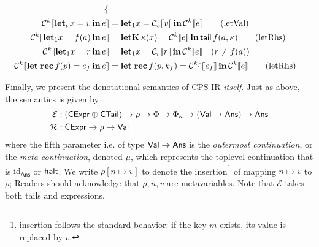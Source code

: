 \documentclass[a4paper, 11pt]{article}
\theoremstyle{remark}\newtheorem*{remark}{Remark}
\theoremstyle{definition}\newtheorem*{definition}{Definition}
\begin{document}
\begin{align*}
\begin{cases}
\end{cases}\\
\mathcal{C}^k\llbracket \mathbf{let}_\iota\, x = v\, \mathbf{in}\, e \rrbracket &=
\mathbf{let}_1 x = \mathcal{C}_v\llbracket v \rrbracket\, \mathbf{in}\, \mathcal{C}^k\llbracket e \rrbracket \tag{letVal} \\
\mathcal{C}^k\llbracket \mathbf{let}_1 x = f(a)\, \mathbf{in}\, e \rrbracket &=
\mathbf{letK}\, \kappa(x) = \mathcal{C}^k\llbracket e \rrbracket\, \mathbf{in}\, \mathsf{tail}\, f(a, \kappa) \tag{letRhs} \\
\mathcal{C}^k\llbracket \mathbf{let}_1 x = r\, \mathbf{in}\, e \rrbracket &=
\mathbf{let}_1 x = \mathcal{C}_r\llbracket r \rrbracket\, \mathbf{in}\, \mathcal{C}^k\llbracket e \rrbracket
\quad (r \neq f(a)) \\
\mathcal{C}^k\llbracket \mathbf{let\;rec}\, f(p) = e_f\, \mathbf{in}\, e \rrbracket &=
\mathbf{let\;rec}\, f(p, k_f) = \mathcal{C}^{k_f}\llbracket e_f \rrbracket\, \mathbf{in}\, \mathcal{C}^k\llbracket e \rrbracket \tag{letRhs} \\
\end{align*}
\endgroup

Finally, we present the denotational semantics of CPS IR \emph{itself}. Just as above, the semantics is
given by
\begin{align*}
\mathcal{E} &: (\mathsf{CExpr}\oplus\mathsf{CTail}) \to \rho \to \Phi \to \Phi_\kappa \to (\mathsf{Val} \to \mathsf{Ans}) \to \mathsf{Ans}\\
\mathcal{R} &: \mathsf{CExpr}\to\rho\to\mathsf{Val}
\end{align*}
where the fifth parameter i.e. of type $\mathsf{Val}\to\mathsf{Ans}$ is the \emph{outermost continuation},
or the \emph{meta-continuation}, denoted $\mu$,
which represents the toplevel continuation that is $\mathrm{id}_\mathsf{Ans}$ or $\mathsf{halt}$.
We write $\rho[n\mapsto v]$ to denote the insertion\footnote{
insertion follows the standard behavior: if the key $m$ exists, its value is replaced by $v$.
}
of mapping $n\mapsto v$ to $\rho$; Readers should acknowledge that $\rho,n,v$ are metavariables.
Note that $\mathcal{E}$ takes both tails and expressions.
\end{document}
